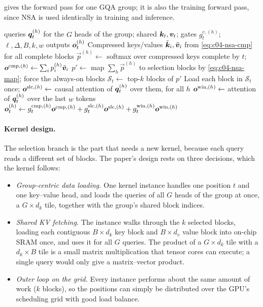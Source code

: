  gives the forward pass for one GQA group; it is also the training forward
pass, since NSA is used identically in training and inference.

\begin{algorithm}[t]
\caption{NSA forward pass for one GQA group (training or prefill)}\label{alg:c04-nsa}
\begin{algorithmic}[1]
\Require queries $\bm{q}^{(h)}_t$ for the $G$ heads of the group; shared $\bm{k}_t,\bm{v}_t$; gates $g^{c,(h)}_t$; $\ell,\Delta,B,k,w$
\Ensure outputs $\bm{o}^{(h)}_t$
\State Compressed keys/values $\tilde{\bm{k}}_i,\tilde{\bm{v}}_i$ from \eqref{eq:c04-nsa-cmp} for all complete blocks
    \State $\vec p^{(h)}\gets$ softmax over compressed keys complete by $t$;\quad $\bm{o}^{\mathrm{cmp},(h)}\gets\sum_i p^{(h)}_i\tilde{\bm{v}}_i$
  \EndFor
  \State $p'\gets$ map $\sum_h\vec p^{(h)}$ to selection blocks by \eqref{eq:c04-nsa-map}; force the always-on blocks
  \State $\mathcal{S}_t\gets$ top-$k$ blocks of $p'$ 
  \State Load each block in $\mathcal{S}_t$ once; $\bm{o}^{\mathrm{slc},(h)}\gets$ causal attention of $\bm{q}^{(h)}_t$ over them, for all $h$
  \State $\bm{o}^{\mathrm{win},(h)}\gets$ attention of $\bm{q}^{(h)}_t$ over the last $w$ tokens
  \State $\bm{o}^{(h)}_t\gets g^{\mathrm{cmp},(h)}_t\bm{o}^{\mathrm{cmp},(h)}+g^{\mathrm{slc},(h)}_t\bm{o}^{\mathrm{slc},(h)}+g^{\mathrm{win},(h)}_t\bm{o}^{\mathrm{win},(h)}$
\EndFor
\end{algorithmic}
\end{algorithm}

\paragraph{Kernel design.}
The selection branch is the part that needs a new kernel, because each query reads a different
set of blocks. The paper's design rests on three decisions, which the \fla{} kernel follows:
\begin{itemize}
  \item \emph{Group-centric data loading.} One kernel instance handles one position $t$ and one
  key--value head, and loads the queries of all $G$ heads of the group at once, a $G\times d_k$
  tile, together with the group's shared block indices.
  \item \emph{Shared KV fetching.} The instance walks through the $k$ selected blocks, loading each
  contiguous $B\times d_k$ key block and $B\times d_v$ value block into on-chip SRAM once, and uses
  it for all $G$ queries. The product of a $G\times d_k$ tile with a $d_k\times B$ tile is a small
  matrix multiplication that tensor cores can execute; a single query would only give a
  matrix--vector product.
  \item \emph{Outer loop on the grid.} Every instance performs about the same amount of work
  ($k$ blocks), so the positions can simply be distributed over the GPU's scheduling grid with
  good load balance.
\end{itemize}

